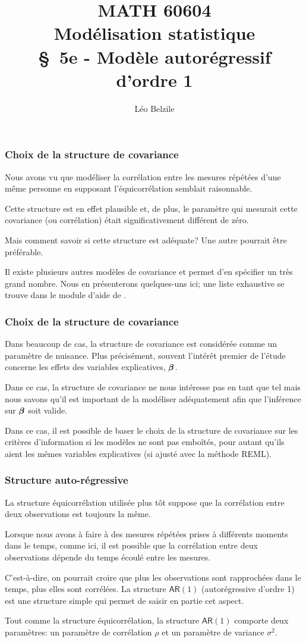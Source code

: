 \documentclass{beamer}
\title[\color{white}{MATH 60604 \S~5e - Modèle autorégressif d'ordre 1}]{\texorpdfstring{MATH 60604 \\Modélisation statistique \\ \S~5e - Modèle autorégressif d'ordre 1}{MATH 60604 \\Modélisation statistique \\ \S~5e - Modèle autorégressif d'ordre 1}}
\author{Léo Belzile}
\institute{HEC Montréal\\
Département de sciences de la décision}
\date{}
\begin{document}
\frame{\titlepage}

\begin{frame}
\frametitle{Choix de la structure de covariance}
\bi
\item Nous avons vu que modéliser la corrélation entre les
mesures répétées d'une même personne en supposant l'équicorrélation semblait raisonnable. 
\item Cette structure est en effet
plausible et, de plus, le paramètre qui mesurait cette covariance (ou
corrélation) était significativement différent de zéro. 
\item Mais comment savoir si cette structure est adéquate? Une autre pourrait être préférable.
\item Il existe plusieurs autres modèles de covariance et \SASlang{} permet d'en spécifier
un très grand nombre. Nous en présenterons quelques-uns ici; une liste
exhaustive se trouve dans le module d'aide de \SASlang{}.
\ei
\end{frame}

\begin{frame}
\frametitle{Choix de la structure de covariance}
\bi
\item Dans beaucoup de cas, la structure de covariance est considérée comme un
paramètre de nuisance. Plus précisément, souvent l'intérêt premier de l'étude
concerne les effets des variables explicatives, $\boldsymbol {\beta}$. 
\item Dans ce cas, la structure
de covariance ne nous intéresse pas en tant que tel mais nous savons qu'il est
important de la modéliser adéquatement afin que l'inférence sur $\boldsymbol {\beta}$ soit
valide. 
\item Dans ce cas, il est possible de baser le choix de la structure de
covariance sur les critères d'information si les modèles ne sont pas emboîtés, pour autant qu'ils aient les mêmes variables explicatives (si ajusté avec la méthode REML).
\ei
\end{frame}

\begin{frame}
\frametitle{Structure auto-régressive}
\bi
\item La structure équicorrélation utilisée plus tôt suppose que la corrélation
entre deux observations est toujours la même. 
\item Lorsque nous avons à faire à
des mesures répétées prises à différents moments dans le temps, comme ici, 
il est possible que la corrélation entre deux observations dépende du temps
écoulé entre les mesures. 
\item C'est-à-dire, on pourrait croire que plus les
observations sont rapprochées dans le temps, plus elles sont corrélées. La
structure \alert{$\mathsf{AR}(1)$} (\alert{autorégressive d'ordre 1}) est une structure simple qui permet
de saisir en partie cet aspect. 
\item Tout comme la structure équicorrélation, la
structure $\mathsf{AR}(1)$ comporte deux paramètres: un paramètre de corrélation $\rho$ et
un paramètre de variance $\sigma^2$.
\ei
\end{frame}
\end{document}
